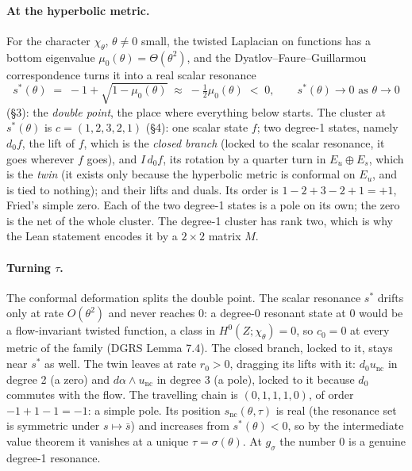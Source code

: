 \documentclass[11pt]{article}
\begin{document}
\paragraph{At the hyperbolic metric.} For the character $\chi_\theta$, $\theta \neq 0$ small,
the twisted Laplacian on functions has a bottom eigenvalue $\mu_0(\theta) = \Theta(\theta^2)$,
and the Dyatlov--Faure--Guillarmou correspondence turns it into a real scalar resonance
\[
s^*(\theta) \;=\; -1 + \sqrt{1 - \mu_0(\theta)} \;\approx\; -\tfrac{1}{2}\mu_0(\theta) \;<\; 0,
\qquad s^*(\theta) \to 0 \text{ as } \theta \to 0
\]
(\S3): the \emph{double point}, the place where everything below starts. The cluster at
$s^*(\theta)$ is $c = (1,2,3,2,1)$ (\S4): one scalar state $f$; two degree-1 states, namely $d_0 f$, the lift of $f$, which is
the \emph{closed branch} (locked to the scalar resonance, it goes wherever $f$ goes), and
$I\,d_0 f$, its rotation by a quarter turn in $E_u \oplus E_s$, which is the \emph{twin} (it
exists only because the hyperbolic metric is conformal on $E_u$, and is tied to nothing); and
their lifts and duals. Its order is $1-2+3-2+1 = +1$, Fried's simple zero. Each of the two
degree-1 states is a pole on its own; the zero is the net of the whole cluster. The degree-1
cluster has rank two, which is why the Lean statement encodes it by a $2\times 2$ matrix $M$.

\paragraph{Turning $\tau$.} The conformal deformation splits the double point. The scalar
resonance $s^*$ drifts only at rate $O(\theta^2)$ and never reaches $0$: a degree-0 resonant state
at $0$ would be a flow-invariant twisted function, a class in $H^0(Z;\chi_\theta) = 0$, so
$c_0 = 0$ at every metric of the family (DGRS Lemma 7.4). The closed branch, locked to it, stays
near $s^*$ as well. The twin leaves at rate $r_0 > 0$, dragging its lifts with it:
$d_0 u_{\mathrm{nc}}$ in degree 2 (a zero) and $d\alpha\wedge u_{\mathrm{nc}}$ in degree 3 (a
pole), locked to it because $d_0$ commutes with the flow. The travelling chain is
$(0,1,1,1,0)$, of order $-1+1-1 = -1$: a simple pole. Its position $s_{\mathrm{nc}}(\theta,\tau)$
is real (the resonance set is symmetric under $s \mapsto \bar s$) and increases from
$s^*(\theta) < 0$, so by the intermediate value theorem it vanishes at a unique
$\tau = \sigma(\theta)$. At $g_{\sigma}$ the number $0$ is a genuine degree-1 resonance.
\end{document}

